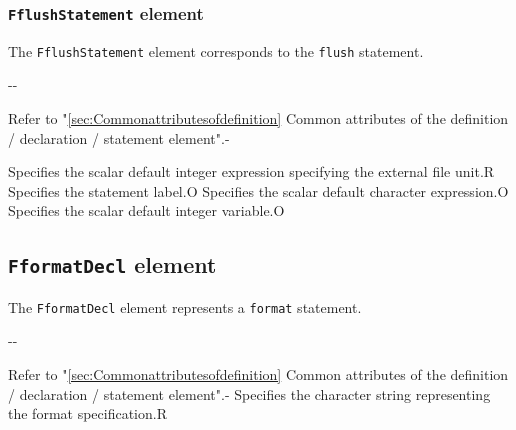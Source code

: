 \subsubsection{ {\tt FflushStatement} element}

The {\tt FflushStatement} element corresponds to the {\tt flush} statement.


\begin{XcodeMLChildElements}
\XcodeMLElementDef{}
{-}{-}
\end{XcodeMLChildElements}

\begin{XcodeMLAttributes}
{Refer to "\ref{sec:Commonattributesofdefinition} Common attributes of the definition / declaration / statement element".}{-}
\end{XcodeMLAttributes}

\begin{XcodeMLControlList}
{Specifies the scalar default integer expression specifying the external file unit.}{R}
{Specifies the statement label.}{O}
{Specifies the scalar default character expression.}{O}
{Specifies the scalar default integer variable.}{O}
\end{XcodeMLControlList}


\subsection{ {\tt FformatDecl} element}

The {\tt FformatDecl} element represents a {\tt format} statement.


\begin{XcodeMLChildElements}
\XcodeMLElementDef{-}
{-}{-}
\end{XcodeMLChildElements}

\begin{XcodeMLAttributes}
{Refer to "\ref{sec:Commonattributesofdefinition} Common attributes of the definition / declaration / statement element".}{-}
{Specifies the character string representing the format specification.}{R}
\end{XcodeMLAttributes}


